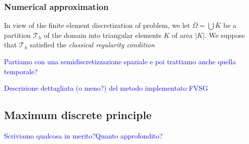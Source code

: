 \subsubsection{Numerical approximation}
In view of the finite element discretization of problem, we let $\bar{\Omega} = \bigcup \bar{K}$ be a partition $\mathcal{T}_h$ of the domain into triangular elements $K$ of area $|K|$.
 We suppose that $\mathcal{T}_h$ satisfied the \textit{classical regularity condition}
  \citep{quarteroni:modnum} 
  
\textcolor{blue}{Partiamo con una semidiscretizzazione spaziale e poi trattiamo anche quella temporale?}

\textcolor{blue}{Descrizione dettagliata (o meno?) del metodo implementato FVSG}

\subsection{Maximum discrete principle}
\textcolor{blue}{Scriviamo qualcosa in merito?Quanto approfondito?}





